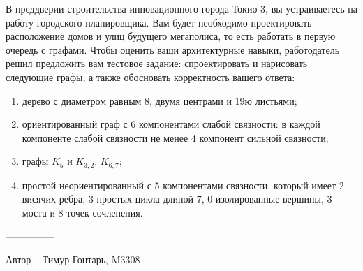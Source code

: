 \question
В преддверии строительства инновационного города Токио-3, вы устраиваетесь на работу городского планировщика. Вам будет необходимо проектировать расположение домов и улиц будущего мегаполиса, то есть работать в первую очередь с графами. Чтобы оценить ваши архитектурные навыки, работодатель решил предложить вам тестовое задание: спроектировать и нарисовать следующие графы, а также обосновать корректность вашего ответа:

\begin{enumerate}
\item  дерево с диаметром равным 8, двумя центрами  и  19ю листьями;
\item  ориентированный граф с 6 компонентами слабой связности: в  каждой компоненте слабой связности не менее 4 компонент сильной связности;
\item  графы $K_5$ и $K_{3,2}$, $K_{6,7}$;
\item  простой неориентированный с 5 компонентами связности, который имеет 2 висячих ребра, 3 простых цикла длиной 7, 0 изолированные вершины, 3 моста и 8 точек сочленения.
\end{enumerate}

---------------

Автор -- Тимур Гонтарь, M3308
